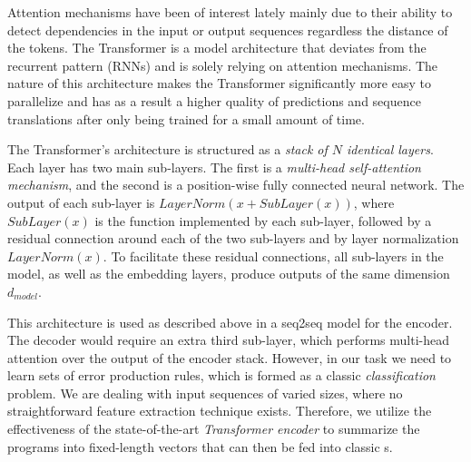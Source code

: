 Attention mechanisms have been of interest lately \citep{Bahdanau2015, Kim2017,
Vaswani_2017} mainly due to their ability to detect dependencies in the input or
output sequences regardless the distance of the tokens. The Transformer is a
model architecture that deviates from the recurrent pattern (\eg RNNs) and is
solely relying on attention mechanisms. The nature of this architecture makes
the Transformer significantly more easy to parallelize and has as a result a
higher quality of predictions and sequence translations after only being trained
for a small amount of time.

The Transformer's architecture is structured as a \emph{stack of $N$ identical
layers}. Each layer has two main sub-layers. The first is a \emph{multi-head
self-attention mechanism}, and the second is a position-wise fully connected
neural network. The output of each sub-layer is $LayerNorm(x + SubLayer(x))$,
where $SubLayer(x)$ is the function implemented by each sub-layer, followed by a
residual connection around each of the two sub-layers and  by layer
normalization $LayerNorm(x)$. To facilitate these residual connections, all
sub-layers in the model, as well as the embedding layers, produce outputs of the
same dimension $d_{model}$.

This architecture is used as described above in a seq2seq model
\citep{Vaswani_2017} for the encoder. The decoder would require an extra third
sub-layer, which performs multi-head attention over the output of the encoder
stack. However, in our task we need to learn sets of error production rules,
which is formed as a classic \emph{classification} problem. We are dealing with
input sequences of varied sizes, where no straightforward feature extraction
technique exists. Therefore, we utilize the effectiveness of the
state-of-the-art \emph{Transformer encoder} to summarize the programs into
fixed-length vectors that can then be fed into classic \dnn{}s.


